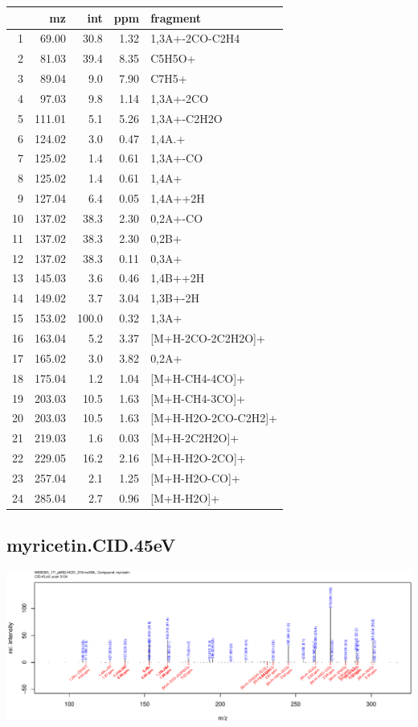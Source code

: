 \documentclass[]{article}
\begin{document}
\begin{table}[ht]
\centering
\begin{tabular}{rrrrl}
  \toprule
 & mz & int & ppm & fragment \\ 
  \midrule
1 & 69.00 & 30.8 & 1.32 & 1,3A+-2CO-C2H4 \\ 
  2 & 81.03 & 39.4 & 8.35 & C5H5O+ \\ 
  3 & 89.04 & 9.0 & 7.90 & C7H5+ \\ 
  4 & 97.03 & 9.8 & 1.14 & 1,3A+-2CO \\ 
  5 & 111.01 & 5.1 & 5.26 & 1,3A+-C2H2O \\ 
  6 & 124.02 & 3.0 & 0.47 & 1,4A.+ \\ 
  7 & 125.02 & 1.4 & 0.61 & 1,3A+-CO \\ 
  8 & 125.02 & 1.4 & 0.61 & 1,4A+ \\ 
  9 & 127.04 & 6.4 & 0.05 & 1,4A++2H \\ 
  10 & 137.02 & 38.3 & 2.30 & 0,2A+-CO \\ 
  11 & 137.02 & 38.3 & 2.30 & 0,2B+ \\ 
  12 & 137.02 & 38.3 & 0.11 & 0,3A+ \\ 
  13 & 145.03 & 3.6 & 0.46 & 1,4B++2H \\ 
  14 & 149.02 & 3.7 & 3.04 & 1,3B+-2H \\ 
  15 & 153.02 & 100.0 & 0.32 & 1,3A+ \\ 
  16 & 163.04 & 5.2 & 3.37 & [M+H-2CO-2C2H2O]+ \\ 
  17 & 165.02 & 3.0 & 3.82 & 0,2A+ \\ 
  18 & 175.04 & 1.2 & 1.04 & [M+H-CH4-4CO]+ \\ 
  19 & 203.03 & 10.5 & 1.63 & [M+H-CH4-3CO]+ \\ 
  20 & 203.03 & 10.5 & 1.63 & [M+H-H2O-2CO-C2H2]+ \\ 
  21 & 219.03 & 1.6 & 0.03 & [M+H-2C2H2O]+ \\ 
  22 & 229.05 & 16.2 & 2.16 & [M+H-H2O-2CO]+ \\ 
  23 & 257.04 & 2.1 & 1.25 & [M+H-H2O-CO]+ \\ 
  24 & 285.04 & 2.7 & 0.96 & [M+H-H2O]+ \\ 
   \bottomrule
\end{tabular}
\end{table}

\clearpage\subsection{myricetin.CID.45eV}
\includegraphics[width=\textwidth]{WEB350_files/figure-latex/unnamed-chunk-3-31}
\end{document}
